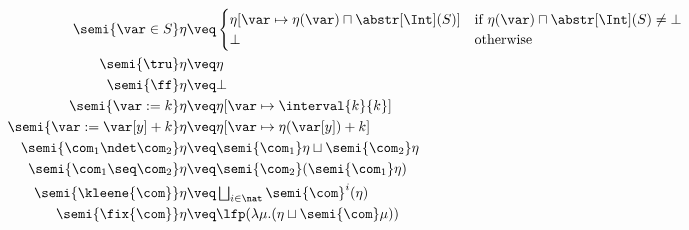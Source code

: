 \begin{align*}
  \semi{\var \in S}\eta 
  & \veq  
    \begin{cases}
      \eta[\var \mapsto \eta(\var)\sqcap \abstr[\Int](S)] & \text{if
                                                            }\eta(\var)\sqcap \abstr[\Int](S)\neq \bot \\ \bot &
                                                                                                                 \text{otherwise}
    \end{cases}\\
  \semi{\tru}\eta 
  & \veq \eta\\
  \semi{\ff}\eta 
  & \veq \bot\\
  \semi{\var := k}\eta 
  & \veq \eta[\var \mapsto \interval{k}{k}]\\
  \semi{\var := \var[y] + k}\eta 
  & \veq \eta[\var \mapsto \eta (\var[y]) + k]\\
  \semi{\com_1 \ndet \com_2} \eta
  & \veq \semi{\com_1} \eta \sqcup \semi{\com_2} \eta\\
  \semi{\com_1 \seq \com_2} \eta
  & \veq \semi{\com_2} (\semi{\com_1} \eta)\\
  \semi{\kleene{\com}} \eta
  & \veq \textstyle \bigsqcup_{i \in \nat} \semi{\com}^i (\eta)\\
  \semi{\fix{\com}} \eta
  & \veq  \lfp(\lambda \mu. (\eta \sqcup \semi{\com} \mu))
\end{align*}


